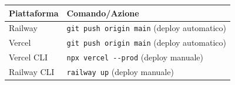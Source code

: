 \begin{center}
\begin{tabularx}{\textwidth}{l X}
\toprule
\textbf{Piattaforma} & \textbf{Comando/Azione} \\
\midrule
Railway & \texttt{git push origin main} (deploy automatico) \\
Vercel & \texttt{git push origin main} (deploy automatico) \\
Vercel CLI & \texttt{npx vercel -{}-prod} (deploy manuale) \\
Railway CLI & \texttt{railway up} (deploy manuale) \\
\bottomrule
\end{tabularx}
\end{center}
